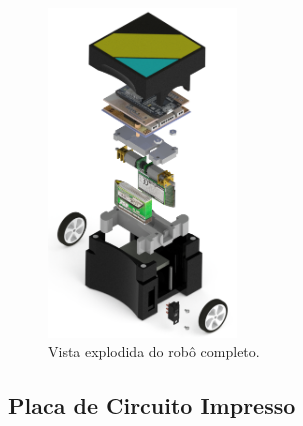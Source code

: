 \begin{figure}[H]
    \centering
    \includegraphics[width=5cm]{imagens/robo_completo_explodido.png}
    \caption{Vista explodida do robô completo.}
    \label{fig:robo_completo_explodido}
\end{figure}

\subsection{Placa de Circuito Impresso}



